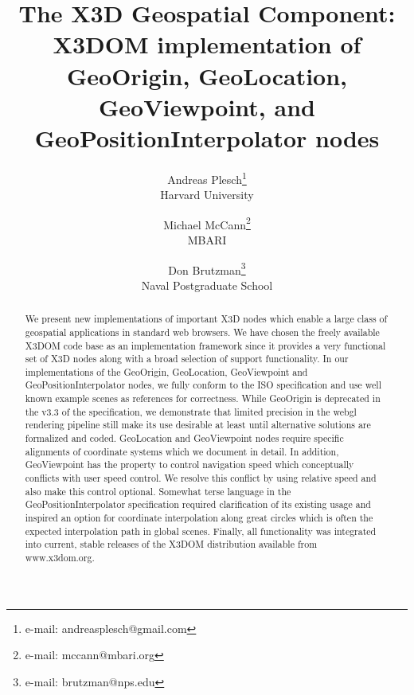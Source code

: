 \documentclass{acmsiggraph}                     %
\title{The X3D Geospatial Component: X3DOM implementation of GeoOrigin, GeoLocation, GeoViewpoint, and GeoPositionInterpolator nodes}
\author{Andreas Plesch\thanks{e-mail: andreasplesch@gmail.com}\\Harvard University
\and Michael McCann\thanks{e-mail: mccann@mbari.org}\\MBARI
\and Don Brutzman\thanks{e-mail: brutzman@nps.edu}\\Naval Postgraduate School}
\begin{document}






\maketitle


\begin{abstract}

We present new implementations of important X3D nodes which enable a large class of geospatial applications in standard web browsers. We have chosen the freely available X3DOM code base as an implementation framework since it provides a very functional set of X3D nodes along with a broad selection of support functionality. In our implementations of the GeoOrigin, GeoLocation, GeoViewpoint and GeoPositionInterpolator nodes, we fully conform to the ISO specification and use well known example scenes as references for correctness. While GeoOrigin is deprecated in the v3.3 of the specification, we demonstrate that limited precision in the webgl rendering pipeline still make its use desirable at least until alternative solutions are formalized and coded. GeoLocation and GeoViewpoint nodes require specific alignments of coordinate systems which we document in detail. In addition, GeoViewpoint has the property to control navigation speed which conceptually conflicts with user speed control. We resolve this conflict by using relative speed and also make this control optional. Somewhat terse language in the GeoPositionInterpolator specification required clarification of its existing usage and inspired an option for coordinate interpolation along great circles which is often the expected interpolation path in global scenes. Finally, all functionality was integrated into current, stable releases of the X3DOM distribution available from www.x3dom.org.

\end{abstract}
\end{document}
